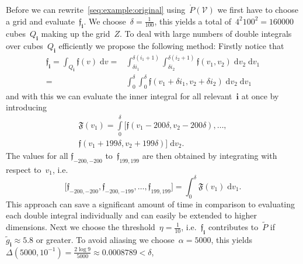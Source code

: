 \documentclass[letterpaper, 10pt, conference]{ieeeconf} %
\providecommand{\bfa}[1]{\mathbf{#1}}
\begin{document}
%
Before we can rewrite~\eqref{seq:example:original} using~$\mathring P(\mathcal V)$ we first have to choose a grid and evaluate~$\mathfrak f_\bfa{i}$.
%
We choose~$\delta=\frac{1}{100}$, this yields a total of~$4^2 100^2=160000$ cubes~$Q_\bfa{i}$ making up the grid~$Z$.
%
To deal with large numbers of double integrals over cubes~$Q_\bfa{i}$ efficiently we propose the following method:
%
Firstly notice that
\begin{align*}
\mathfrak f_\bfa{i}=\int_{Q_\bfa{i}}\mathfrak f(v) \; \mathrm d v = &\int_{\delta i_1}^{\delta(i_1+1)}\int_{\delta i_2}^{\delta(i_2+1)}\mathfrak f(v_1,v_2) \; \mathrm d v_2 \; \mathrm d v_1 \\
= &\int_0^\delta\int_0^\delta \mathfrak f(v_1+\delta i_1,v_2+\delta i_2) \; \mathrm d v_2 \; \mathrm d v_1
\end{align*}
and with this we can evaluate the inner integral for all relevant~$\bfa{i}$ at once by introducing
%
\begin{multline*}
\mathfrak F(v_1) =
\int\limits_0^\delta 
\bigl[ 
\mathfrak f(v_1-200\delta,v_2-200\delta) , \ldots , \\
\mathfrak f(v_1+199\delta,v_2+199\delta) \bigr] \; \mathrm d v_2 .
\end{multline*}
%
The values for all $\mathfrak f_{-200,-200}$ to~$\mathfrak f_{199,199}$ are then obtained by integrating with respect to~$v_1$, i.e. 
\[
\bigl[ \mathfrak f_{-200,-200}, \mathfrak f_{-200,-199},\dots,\mathfrak f_{199,199} \bigr] =\int_0^\delta\mathfrak F(v_1) \; \mathrm d v_1.
\]
%
This approach can save a significant amount of time in comparison to evaluating each double integral individually and can easily be extended to higher dimensions.
%
Next we choose the threshold~$\eta=\frac{1}{10}$, i.e.~$\mathfrak f_\bfa{i}$ contributes to~$\tilde{P}$ if~$\tilde g_\bfa{i}\approx5.8$ or greater.
%
To avoid aliasing we choose~$\alpha=5000$, this yields~$\Delta(5000,10^{-1}) = \frac{2\log9}{5000}\approx0.0008789<\delta$,
%
\end{document}
